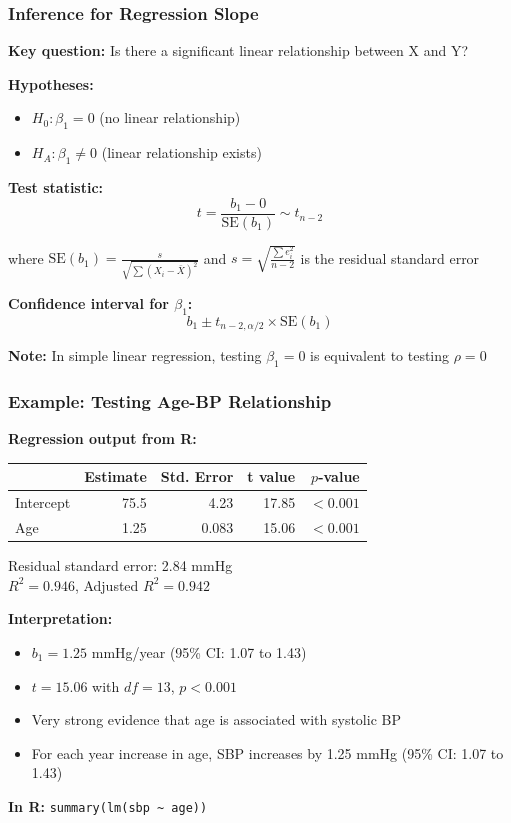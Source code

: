 \documentclass{beamer}
\begin{document}
\begin{frame}
\frametitle{Inference for Regression Slope}
\textbf{Key question:} Is there a significant linear relationship between X and Y?

\vspace{0.3cm}
\textbf{Hypotheses:}
\begin{itemize}
\item $H_0: \beta_1 = 0$ (no linear relationship)
\item $H_A: \beta_1 \neq 0$ (linear relationship exists)
\end{itemize}

\vspace{0.3cm}
\textbf{Test statistic:}
$$t = \frac{b_1 - 0}{\text{SE}(b_1)} \sim t_{n-2}$$

where $\text{SE}(b_1) = \frac{s}{\sqrt{\sum(X_i - \bar{X})^2}}$ and $s = \sqrt{\frac{\sum e_i^2}{n-2}}$ is the residual standard error

\vspace{0.3cm}
\textbf{Confidence interval for $\beta_1$:}
$$b_1 \pm t_{n-2, \alpha/2} \times \text{SE}(b_1)$$

\vspace{0.3cm}
\textbf{Note:} In simple linear regression, testing $\beta_1 = 0$ is equivalent to testing $\rho = 0$
\end{frame}

\begin{frame}
\frametitle{Example: Testing Age-BP Relationship}
\textbf{Regression output from R:}

\begin{center}
\small
\begin{tabular}{lrrrr}
\toprule
& Estimate & Std. Error & t value & $p$-value \\
\midrule
Intercept & 75.5 & 4.23 & 17.85 & $<0.001$ \\
Age & 1.25 & 0.083 & 15.06 & $<0.001$ \\
\bottomrule
\end{tabular}
\end{center}

Residual standard error: 2.84 mmHg\\
$R^2 = 0.946$, Adjusted $R^2 = 0.942$

\vspace{0.3cm}
\textbf{Interpretation:}
\begin{itemize}
\item $b_1 = 1.25$ mmHg/year (95\% CI: 1.07 to 1.43)
\item $t = 15.06$ with $df = 13$, $p < 0.001$
\item Very strong evidence that age is associated with systolic BP
\item For each year increase in age, SBP increases by 1.25 mmHg (95\% CI: 1.07 to 1.43)
\end{itemize}

\vspace{0.3cm}
\textbf{In R:} \texttt{summary(lm(sbp \textasciitilde\ age))}
\end{frame}
\end{document}
